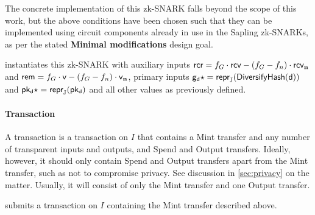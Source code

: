 \begin{itemize}
    The concrete implementation of this zk-SNARK falls beyond the scope of this work, but the above conditions have been chosen such that they can be implemented using circuit components already in use in the Sapling zk-SNARKs, as per the stated \textbf{Minimal modifications} design goal.
    
    \medskip
    \issuer instantiates this zk-SNARK with auxiliary inputs $\mathsf{rcr} = f_G \cdot \mathsf{rcv} - (f_G - f_n) \cdot \mathsf{rcv_{\mathbf{n}}}$ and $\mathsf{rem} = f_G \cdot \mathsf{v} - (f_G - f_n) \cdot \mathsf{v_{\mathbf{n}}}$, primary inputs $\mathsf{g_d\star} = \mathsf{repr}_{\mathbb{J}}(\mathsf{DiversifyHash}(\mathsf{d}))$ and $\mathsf{pk_d\star} = \mathsf{repr}_{\mathbb{J}}(\mathsf{pk_d})$ and all other values as previously defined.
\end{itemize}

\paragraph{Transaction}
A \mint transaction is a transaction on $I$ that contains a Mint transfer and any number of transparent inputs and outputs, and Spend and Output transfers.
Ideally, however, it should only contain Spend and Output transfers apart from the Mint transfer, such as not to compromise privacy.
See discussion in \cref{sec:privacy} on the matter.
Usually, it will consist of only the Mint transfer and one Output transfer.

\issuer submits a \mint transaction on $I$ containing the Mint transfer described above.

